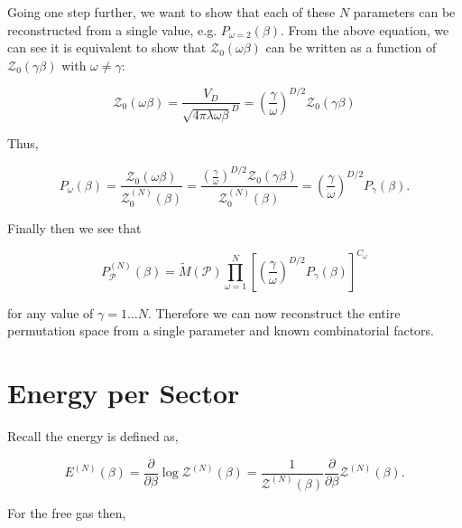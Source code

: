 \documentclass[aps,preprint,showpacs,superscriptaddress,groupedaddress]{revtex4}  %
\begin{document}
Going one step further, we want to show that each of these $N$ parameters can be reconstructed from a single value, e.g. $P_{\omega=2}(\beta)$. From the above equation, we can see it is equivalent to show that $\mathcal{Z}_{0}(\omega\beta)$ can be written as a function of $\mathcal{Z}_{0}(\gamma\beta)$ with $\omega \neq \gamma$:

\begin{equation}
  \mathcal{Z}_{0}(\omega\beta) = \frac{V_{D}}{\sqrt{4\pi\lambda\omega\beta}^{D}} = (\frac{\gamma}{\omega})^{D/2} \mathcal{Z}_{0}(\gamma\beta)
\end{equation}

Thus,

\begin{equation}
  P_{\omega}(\beta) = \frac{\mathcal{Z}_{0}(\omega\beta)}{\mathcal{Z}_{0}^{(N)}(\beta)} = \frac{(\frac{\gamma}{\omega})^{D/2} \mathcal{Z}_{0}(\gamma\beta)}{\mathcal{Z}_{0}^{(N)}(\beta)} = (\frac{\gamma}{\omega})^{D/2} P_{\gamma}(\beta).
\end{equation}

Finally then we see that

\begin{equation}
  P_{\mathcal{P}}^{(N)}(\beta) = \tilde{M}(\mathcal{P}) \prod_{\omega=1}^{N} [(\frac{\gamma}{\omega})^{D/2} P_{\gamma}(\beta)]^{C_{\omega}}
\end{equation}

for any value of $\gamma = 1 \dots N$. Therefore we can now reconstruct the entire permutation space from a single parameter and known combinatorial factors.


\section{Energy per Sector}

Recall the energy is defined as,

\begin{equation}
  E^{(N)}(\beta) = \frac{\partial}{\partial\beta} \log{\mathcal{Z}^{(N)}(\beta)} = \frac{1}{\mathcal{Z}^{(N)}(\beta)} \frac{\partial}{\partial\beta} \mathcal{Z}^{(N)}(\beta).
\end{equation}

For the free gas then,
\end{document}

